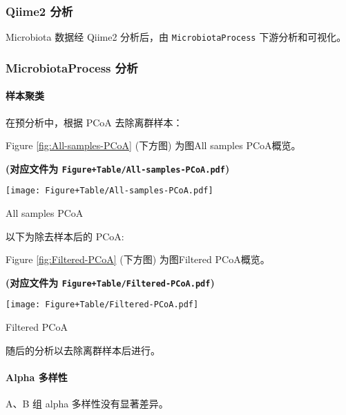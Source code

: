 \documentclass[
]{article}
\begin{document}
\hypertarget{qiime2-ux5206ux6790}{%
\subsubsection{Qiime2 分析}\label{qiime2-ux5206ux6790}}

Microbiota 数据经 Qiime2 分析后，由 \texttt{MicrobiotaProcess} 下游分析和可视化。

\hypertarget{microbiotaprocess-ux5206ux6790}{%
\subsubsection{MicrobiotaProcess 分析}\label{microbiotaprocess-ux5206ux6790}}

\hypertarget{ux6837ux672cux805aux7c7b}{%
\paragraph{样本聚类}\label{ux6837ux672cux805aux7c7b}}

在预分析中，根据 PCoA 去除离群样本：

Figure \ref{fig:All-samples-PCoA} (下方图) 为图All samples PCoA概览。

\textbf{(对应文件为 \texttt{Figure+Table/All-samples-PCoA.pdf})}

\def\@captype{figure}
\begin{center}
\texttt{[image: Figure+Table/All-samples-PCoA.pdf]}
\caption{All samples PCoA}\label{fig:All-samples-PCoA}
\end{center}

以下为除去样本后的 PCoA:

Figure \ref{fig:Filtered-PCoA} (下方图) 为图Filtered PCoA概览。

\textbf{(对应文件为 \texttt{Figure+Table/Filtered-PCoA.pdf})}

\def\@captype{figure}
\begin{center}
\texttt{[image: Figure+Table/Filtered-PCoA.pdf]}
\caption{Filtered PCoA}\label{fig:Filtered-PCoA}
\end{center}

随后的分析以去除离群样本后进行。

\hypertarget{alpha}{%
\paragraph{Alpha 多样性}\label{alpha}}

A、B 组 alpha 多样性没有显著差异。
\end{document}
